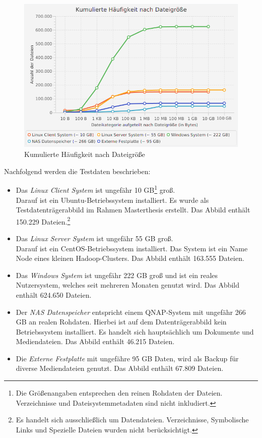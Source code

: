  \begin{figure}[ht]
  \centering
  \includegraphics[width=\textwidth]{./resource/fileSize_cumulatedAmount.png}
  \caption{Kumulierte Häufigkeit nach Dateigröße}
  \label{fig:file_size_c_amount}
\end{figure}

\noindent
Nachfolgend werden die Testdaten beschrieben:
\begin{itemize}
\item Das \textit{Linux Client System} ist ungefähr 10 GB\footnote{Die Größenangaben entsprechen den reinen Rohdaten der Dateien. Verzeichnisse und Dateisystemmetadaten sind nicht inkludiert.} groß.\\ Darauf ist ein Ubuntu-Betriebssystem installiert. Es wurde als Testdatenträgerabbild im Rahmen Masterthesis erstellt. Das Abbild enthält 150.229 Dateien.\footnote{Es handelt sich ausschließlich um Datendateien. Verzeichnisse, Symbolische Links und Spezielle Dateien wurden nicht berücksichtigt.}
\item Das \textit{Linux Server System} ist ungefähr 55 GB groß.\\ Darauf ist ein CentOS-Betriebssystem installiert. Das System ist ein Name Node eines kleinen Hadoop-Clusters. Das Abbild enthält 163.555 Dateien.
\item Das \textit{Windows System} ist ungefähr 222 GB groß und ist ein reales Nutzersystem, welches seit mehreren Monaten genutzt wird. Das Abbild enthält 624.650 Dateien.
\item Der \textit{NAS Datenspeicher} entspricht einem QNAP-System mit ungefähr 266 GB an realen Rohdaten. Hierbei ist auf dem Datenträgerabbild kein Betriebssystem installiert. Es handelt sich hauptsächlich um Dokumente und Mediendateien. Das Abbild enthält 46.215 Dateien.
\item Die \textit{Externe Festplatte} mit ungefähre 95 GB Daten, wird als Backup für diverse Mediendateien genutzt. Das Abbild enthält 67.809 Dateien.
\end{itemize}

